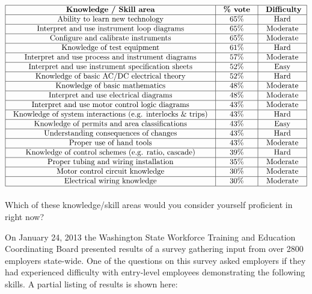$$\vbox{\offinterlineskip
\halign{\strut
\vrule \quad\hfil # \ \hfil & 
\vrule \quad\hfil # \ \hfil & 
\vrule \quad\hfil # \ \hfil \vrule \cr
\noalign{\hrule}
%
{\bf Knowledge / Skill area} & {\bf \% vote} & {\bf Difficulty}\cr
%
\noalign{\hrule}
%
Ability to learn new technology & 65\% & Hard \cr
%
\noalign{\hrule}
%
Interpret and use instrument loop diagrams & 65\% & Moderate \cr
%
\noalign{\hrule}
%
Configure and calibrate instruments & 65\% & Moderate \cr
%
\noalign{\hrule}
%
Knowledge of test equipment & 61\% & Hard \cr
%
\noalign{\hrule}
%
Interpret and use process and instrument diagrams & 57\% & Moderate \cr
%
\noalign{\hrule}
%
Interpret and use instrument specification sheets & 52\% & Easy \cr
%
\noalign{\hrule}
%
Knowledge of basic AC/DC electrical theory & 52\% & Hard \cr
%
\noalign{\hrule}
%
Knowledge of basic mathematics & 48\% & Moderate \cr
%
\noalign{\hrule}
%
Interpret and use electrical diagrams & 48\% & Moderate \cr
%
\noalign{\hrule}
%
Interpret and use motor control logic diagrams & 43\% & Moderate \cr
%
\noalign{\hrule}
%
Knowledge of system interactions (e.g. interlocks \& trips) & 43\% & Hard \cr
%
\noalign{\hrule}
%
Knowledge of permits and area classifications & 43\% & Easy \cr
%
\noalign{\hrule}
%
Understanding consequences of changes & 43\% & Hard \cr
%
\noalign{\hrule}
%
Proper use of hand tools & 43\% & Moderate \cr
%
\noalign{\hrule}
%
Knowledge of control schemes (e.g. ratio, cascade) & 39\% & Hard \cr
%
\noalign{\hrule}
%
Proper tubing and wiring installation & 35\% & Moderate \cr
%
\noalign{\hrule}
%
Motor control circuit knowledge & 30\% & Moderate \cr
%
\noalign{\hrule}
%
Electrical wiring knowledge & 30\% & Moderate \cr
%
\noalign{\hrule}
} %
}$$ %

Which of these knowledge/skill areas would you consider yourself proficient in right now?

\vskip 10pt

On January 24, 2013 the Washington State Workforce Training and Education Coordinating Board presented results of a survey gathering input from over 2800 employers state-wide.  One of the questions on this survey asked employers if they had experienced difficulty with entry-level employees demonstrating the following skills.  A partial listing of results is shown here:

